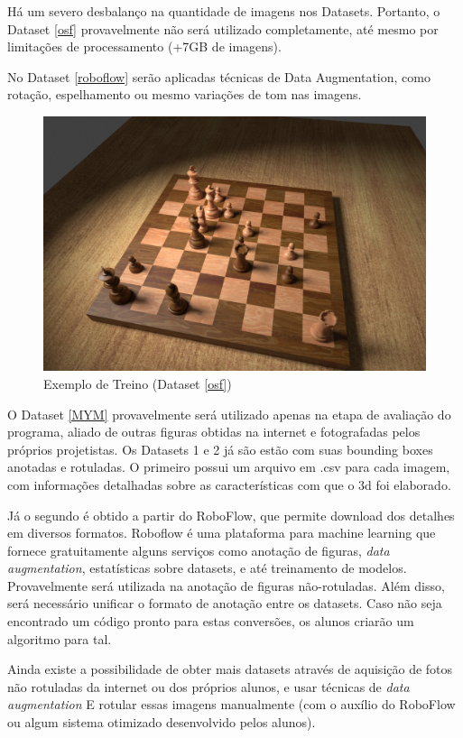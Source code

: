 \documentclass[a4paper,12pt,twoside]{article}
\begin{document}
Há um severo desbalanço na quantidade de imagens nos Datasets.
Portanto, o Dataset \ref{osf} provavelmente não será utilizado completamente,
até mesmo por limitações de processamento (+7GB de imagens).

No Dataset \ref{roboflow} serão aplicadas técnicas de Data Augmentation,
como rotação, espelhamento ou mesmo variações de tom nas imagens.

\begin{figure}[h!]
\centering
  \includegraphics[width=0.8\linewidth]{fig/treino.jpg}
  \caption{Exemplo de Treino (Dataset \ref{osf})}
\label{fig:treino}
\end{figure}

O Dataset \ref{MYM} provavelmente será utilizado apenas na etapa de avaliação do programa,
aliado de outras figuras obtidas na internet e fotografadas pelos próprios projetistas.
Os Datasets 1 e 2 já são estão com suas bounding boxes anotadas e rotuladas.
O primeiro possui um arquivo em .csv para cada imagem,
com informações detalhadas sobre as características com que o 3d foi elaborado.

Já o segundo é obtido a partir do RoboFlow, que permite download dos detalhes em diversos formatos.
Roboflow é uma plataforma para machine learning que fornece gratuitamente alguns serviços como anotação de figuras,
\textit{data augmentation}, estatísticas sobre datasets, e até treinamento de modelos.
Provavelmente será utilizada na anotação de figuras não-rotuladas.
Além disso, será necessário unificar o formato de anotação entre os datasets.
Caso não seja encontrado um código pronto para estas conversões, os alunos criarão um algoritmo para tal.

Ainda existe a possibilidade de obter mais datasets através de aquisição de fotos
não rotuladas da internet ou dos próprios alunos, e usar técnicas de \textit{data augmentation}
E rotular essas imagens manualmente 
(com o auxílio do RoboFlow ou algum sistema otimizado desenvolvido pelos alunos).
\end{document}
